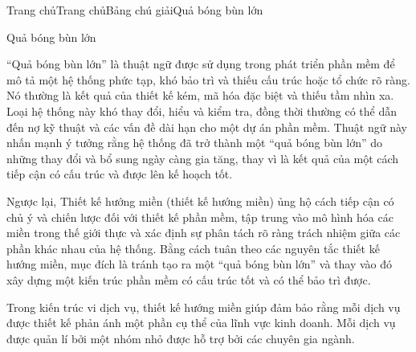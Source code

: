 Trang chủTrang chủBảng chú giảiQuả bóng bùn lớn

Quả bóng bùn lớn

“Quả bóng bùn lớn” là thuật ngữ được sử dụng trong phát triển phần mềm để mô tả một hệ thống phức tạp, khó bảo trì và thiếu cấu trúc hoặc tổ chức rõ ràng. Nó thường là kết quả của thiết kế kém, mã hóa đặc biệt và thiếu tầm nhìn xa. Loại hệ thống này khó thay đổi, hiểu và kiểm tra, đồng thời thường có thể dẫn đến nợ kỹ thuật và các vấn đề dài hạn cho một dự án phần mềm. Thuật ngữ này nhấn mạnh ý tưởng rằng hệ thống đã trở thành một “quả bóng bùn lớn” do những thay đổi và bổ sung ngày càng gia tăng, thay vì là kết quả của một cách tiếp cận có cấu trúc và được lên kế hoạch tốt.

Ngược lại, Thiết kế hướng miền (thiết kế hướng miền) ủng hộ cách tiếp cận có chủ ý và chiến lược đối với thiết kế phần mềm, tập trung vào mô hình hóa các miền trong thế giới thực và xác định sự phân tách rõ ràng trách nhiệm giữa các phần khác nhau của hệ thống. Bằng cách tuân theo các nguyên tắc thiết kế hướng miền, mục đích là tránh tạo ra một “quả bóng bùn lớn” và thay vào đó xây dựng một kiến trúc phần mềm có cấu trúc tốt và có thể bảo trì được.







Trong kiến trúc vi dịch vụ, thiết kế hướng miền giúp đảm bảo rằng mỗi dịch vụ được thiết kế phản ánh một phần cụ thể của lĩnh vực kinh doanh. Mỗi dịch vụ được quản lí bởi một nhóm nhỏ được hỗ trợ bởi các chuyên gia ngành.



